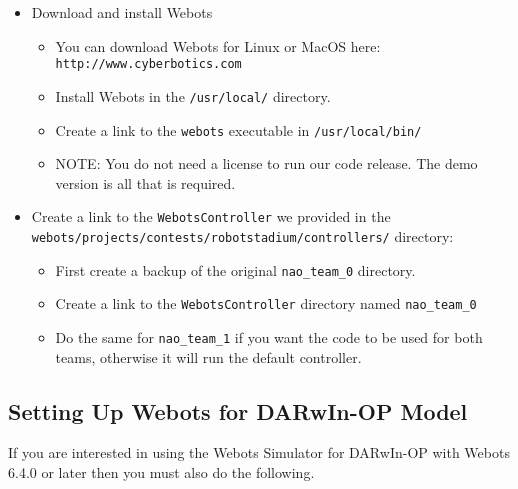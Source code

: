 \documentclass{article}
\begin{document}
    \begin{itemize}
      \item Download and install Webots
      \begin{itemize}
        \item You can download Webots for Linux or MacOS here: \\
          \texttt{http://www.cyberbotics.com}
        \item Install Webots in the \texttt{/usr/local/} directory. 
        \item Create a link to the \texttt{webots} executable in \texttt{/usr/local/bin/}
        \item NOTE: You do not need a license to run our code release. The demo version is all that is required.
      \end{itemize}
      \item Create a link to the \texttt{WebotsController} we provided in the \\
        \texttt{webots/projects/contests/robotstadium/controllers/} directory:
      \begin{itemize}
        \item First create a backup of the original \texttt{nao\_team\_0} directory.
        \item Create a link to the \texttt{WebotsController} directory named \texttt{nao\_team\_0}
        \item Do the same for \texttt{nao\_team\_1} if you want the code to be used for both teams, otherwise it will run the default controller.
      \end{itemize}
    \end{itemize}
    
    \subsection{Setting Up Webots for DARwIn-OP Model}
    If you are interested in using the Webots Simulator for DARwIn-OP with Webots 6.4.0 or later then you must also do the following.
\end{document}
